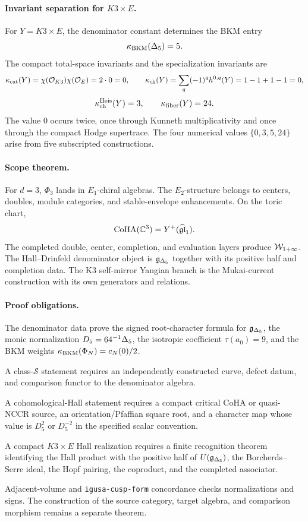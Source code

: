 \paragraph{Invariant separation for \texorpdfstring{$K3\times E$}{K3 x E}.}
For \(Y=K3\times E\), the denominator constant determines the BKM entry
\[
  \kappa_{\mathrm{BKM}}(\Delta_{5})=5.
\]
The compact total-space invariants and the specialization invariants are
\[
  \kappa_{\mathrm{cat}}(Y)=\chi(\mathcal O_{K3})\chi(\mathcal O_E)=2\cdot0=0,\qquad
  \kappa_{\mathrm{ch}}(Y)=\sum_q(-1)^q h^{0,q}(Y)=1-1+1-1=0,
\]
\[
  \kappa_{\mathrm{ch}}^{\mathrm{Heis}}(Y)=3,\qquad
  \kappa_{\mathrm{fiber}}(Y)=24.
\]
The value \(0\) occurs twice, once through Kunneth multiplicativity and
once through the compact Hodge supertrace.  The four numerical values
\(\{0,3,5,24\}\) arise from five subscripted constructions.

\paragraph{Scope theorem.}
For \(d=3\), \(\Phi_{3}\) lands in \(E_1\)-chiral algebras.
The \(E_2\)-structure belongs to centers, doubles, module categories,
and stable-envelope enhancements.  On the toric chart,
\[
  \operatorname{CoHA}(\mathbb C^3)=Y^+(\widehat{\mathfrak{gl}}_1).
\]
The completed double, center, completion, and evaluation layers produce
\(\mathcal{W}_{1+\infty}\).  The Hall--Drinfeld denominator object is \(\mathfrak{g}_{\Delta_{5}}\) together
with its positive half and completion data.  The K3 self-mirror Yangian
branch is the Mukai-current construction with its own generators and
relations.

\paragraph{Proof obligations.}
The denominator data prove the signed root-character formula for
\(\mathfrak{g}_{\Delta_{5}}\), the monic normalization \(D_5=64^{-1}\Delta_{5}\), the
isotropic coefficient \(\tau(a_0)=9\), and the BKM weights
\(\kappa_{\mathrm{BKM}}(\Phi_N)=c_N(0)/2\).

A class-\(\mathcal S\) statement requires an independently constructed
curve, defect datum, and comparison functor to the denominator algebra.

A cohomological-Hall statement requires a compact critical CoHA or
quasi-NCCR source, an orientation/Pfaffian square root, and a character
map whose value is \(D_5^2\) or \(D_5^{-2}\) in the specified scalar
convention.

A compact \(K3\times E\) Hall realization requires a finite recognition
theorem identifying the Hall product with the positive half of
\(U(\mathfrak{g}_{\Delta_{5}})\), the Borcherds--Serre ideal, the Hopf pairing, the
coproduct, and the completed associator.

Adjacent-volume and \texttt{igusa-cusp-form} concordance checks
normalizations and signs.  The construction of the source category,
target algebra, and comparison morphism remains a separate theorem.
